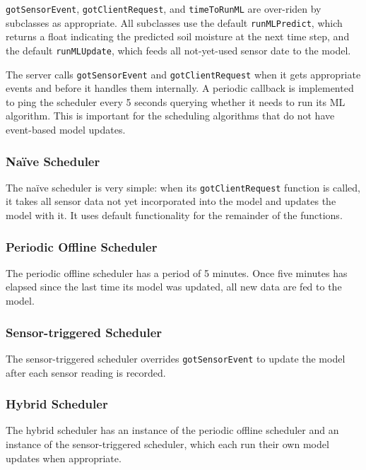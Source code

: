 \documentclass[a4paper]{acm_proc_article-sp}
\begin{document}
\lstinline|gotSensorEvent|, \lstinline|gotClientRequest|, and \lstinline|timeToRunML| are over-riden by subclasses as appropriate.  All subclasses use the default \lstinline|runMLPredict|, which returns a float indicating the predicted soil moisture at the next time step, and the default \lstinline|runMLUpdate|, which feeds all not-yet-used sensor date to the model.

The server calls \lstinline|gotSensorEvent| and \lstinline|gotClientRequest| when it gets appropriate events and before it handles them internally.  A periodic callback is implemented to ping the scheduler every 5 seconds querying whether it needs to run its ML algorithm.  This is important for the scheduling algorithms that do not have event-based model updates.

\subsubsection{Na\"{i}ve Scheduler}

The na\"{i}ve scheduler is very simple: when its \lstinline|gotClientRequest| function is called, it takes all sensor data not yet incorporated into the model and updates the model with it.  It uses default functionality for the remainder of the functions.

\subsubsection{Periodic Offline Scheduler}

The periodic offline scheduler has a period of 5 minutes.  Once five minutes has elapsed since the last time its model was updated, all new data are fed to the model.

\subsubsection{Sensor-triggered Scheduler}

The sensor-triggered scheduler overrides \lstinline|gotSensorEvent| to update the model after each sensor reading is recorded.

\subsubsection{Hybrid Scheduler}

The hybrid scheduler has an instance of the periodic offline scheduler and an instance of the sensor-triggered scheduler, which each run their own model updates when appropriate.
\end{document}
